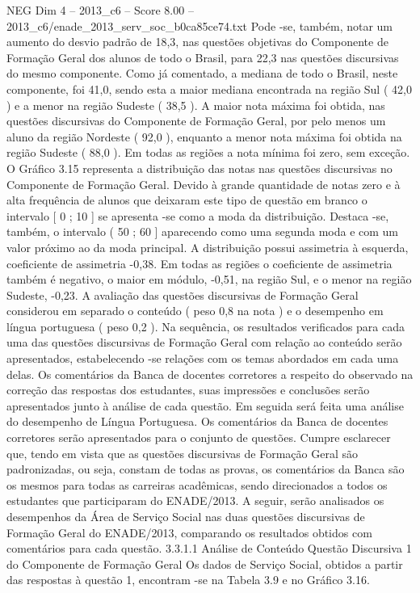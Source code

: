 \begin{textsample}{NEG Dim 4 – 2013\_c6 – Score 8.00 – 2013\_c6/enade\_2013\_serv\_soc\_b0ca85ce74.txt}
Pode -se, também, notar um aumento do desvio padrão de 18,3, nas questões objetivas do Componente de Formação Geral dos alunos de todo o Brasil, para 22,3 nas questões discursivas do mesmo componente.
Como já comentado, a mediana de todo o Brasil, neste componente, foi 41,0, sendo esta a maior mediana encontrada na região Sul ( 42,0 ) e a menor na região Sudeste ( 38,5 ).
A maior nota máxima foi obtida, nas questões discursivas do Componente de Formação Geral, por pelo menos um aluno da região Nordeste ( 92,0 ), enquanto a menor nota máxima foi obtida na região Sudeste ( 88,0 ).
Em todas as regiões a nota mínima foi zero, sem exceção.
O Gráfico 3.15 representa a distribuição das notas nas questões discursivas no Componente de Formação Geral.
Devido à grande quantidade de notas zero e à alta frequência de alunos que deixaram este tipo de questão em branco o intervalo [ 0 ; 10 ] se apresenta -se como a moda da distribuição.
Destaca -se, também, o intervalo ( 50 ; 60 ] aparecendo como uma segunda moda e com um valor próximo ao da moda principal.
A distribuição possui assimetria à esquerda, coeficiente de assimetria -0,38.
Em todas as regiões o coeficiente de assimetria também é negativo, o maior em módulo, -0,51, na região Sul, e o menor na região Sudeste, -0,23.
A avaliação das questões discursivas de Formação Geral considerou em separado o conteúdo ( peso 0,8 na nota ) e o desempenho em língua portuguesa ( peso 0,2 ).
Na sequência, os resultados verificados para cada uma das questões discursivas de Formação Geral com relação ao conteúdo serão apresentados, estabelecendo -se relações com os temas abordados em cada uma delas.
Os comentários da Banca de docentes corretores a respeito do observado na correção das respostas dos estudantes, suas impressões e conclusões serão apresentados junto à análise de cada questão.
Em seguida será feita uma análise do desempenho de Língua Portuguesa.
Os comentários da Banca de docentes corretores serão apresentados para o conjunto de questões.
Cumpre esclarecer que, tendo em vista que as questões discursivas de Formação Geral são padronizadas, ou seja, constam de todas as provas, os comentários da Banca são os mesmos para todas as carreiras acadêmicas, sendo direcionados a todos os estudantes que participaram do ENADE/2013.
A seguir, serão analisados os desempenhos da Área de Serviço Social nas duas questões discursivas de Formação Geral do ENADE/2013, comparando os resultados obtidos com comentários para cada questão. 3.3.1.1 Análise de Conteúdo Questão Discursiva 1 do Componente de Formação Geral Os dados de Serviço Social, obtidos a partir das respostas à questão 1, encontram -se na Tabela 3.9 e no Gráfico 3.16.

\end{textsample}
